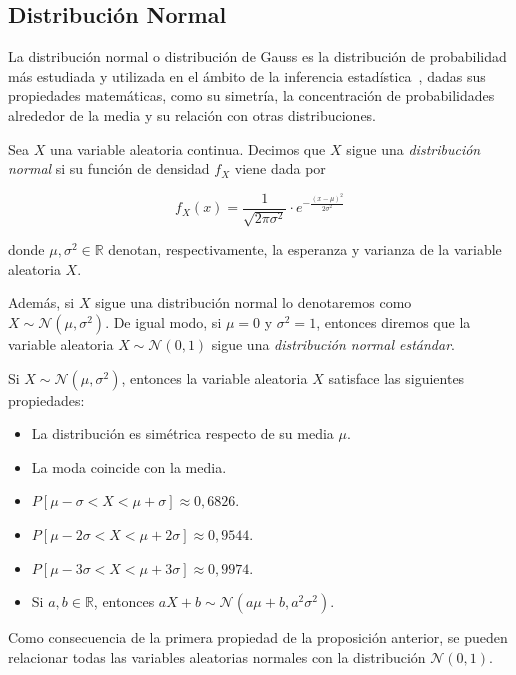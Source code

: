 \subsection{Distribución Normal}
La distribución normal o distribución de Gauss es la distribución de probabilidad más estudiada y utilizada en el ámbito de la inferencia estadística~\cite{Bryc1995TheND}, dadas sus propiedades matemáticas, como su simetría, la concentración de probabilidades alrededor de la media y su relación con otras distribuciones.

\begin{definicion}
    Sea $X$ una variable aleatoria continua. Decimos que $X$ sigue una \emph{distribución normal} si su función de densidad $f_X$ viene dada por

    \[ f_X(x) = \frac{1}{\sqrt{2\pi \sigma^2}} \cdot e^{-\frac{{(x - \mu)}^2}{2\sigma^2}} \]

    donde $\mu, \sigma^2 \in \mathbb{R}$ denotan, respectivamente, la esperanza y varianza de la variable aleatoria $X$.

    Además, si $X$ sigue una distribución normal lo denotaremos como $X \sim \mathcal{N}(\mu,\sigma^2)$. De igual modo, si $\mu = 0$ y $\sigma^2=1$, entonces diremos que la variable aleatoria $X \sim \mathcal{N}(0,1)$ sigue una \emph{distribución normal estándar}.
\end{definicion}

\begin{proposicion}
    Si $X \sim \mathcal{N}(\mu,\sigma^2)$, entonces la variable aleatoria $X$ satisface las siguientes propiedades:

    \begin{itemize}
        \item La distribución es simétrica respecto de su media $\mu$.
        \item La moda coincide con la media.
        \item $P[\mu - \sigma < X < \mu + \sigma] \approx 0,6826$.
        \item $P[\mu - 2\sigma < X < \mu + 2\sigma] \approx 0,9544$.
        \item $P[\mu - 3\sigma < X < \mu + 3\sigma] \approx 0,9974$.
        \item Si $a, b \in \mathbb{R}$, entonces $aX + b \sim \mathcal{N}(a\mu + b, a^2\sigma^2)$.
    \end{itemize}
\end{proposicion}

Como consecuencia de la primera propiedad de la proposición anterior, se pueden relacionar todas las variables aleatorias normales con la distribución $\mathcal{N}(0,1)$.

